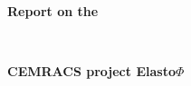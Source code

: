 \documentclass[a4paper,11pt]{report}
\begin{document}
\thispagestyle{empty}

\centerline{\textbf{\huge Report on the}}
\quad\\[5pt]
\centerline{\textbf{\huge CEMRACS project Elasto$\Phi$}}
\end{document}
